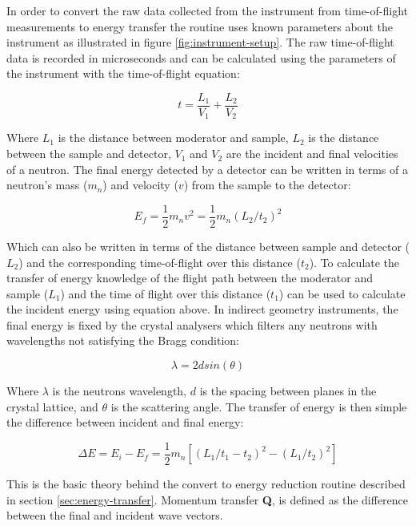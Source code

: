 \documentclass[paper=a4, fontsize=11pt]{scrartcl}	%
\numberwithin{equation}{section}															%
\numberwithin{figure}{section}																%
\numberwithin{table}{section}																%
\begin{document}
In order to convert the raw data collected from the instrument from time-of-flight measurements to energy transfer the routine uses known parameters about the instrument as illustrated in figure \ref{fig:instrument-setup}. The raw time-of-flight data is recorded in microseconds and can be calculated using the parameters of the instrument with the time-of-flight equation:

\begin{equation}
t = \frac{L_1}{V_1} + \frac{L_2}{V_2}
\end{equation}

Where $L_1$ is the distance between moderator and sample, $L_2$ is the distance between the sample and detector, $V_1$ and $V_2$ are the incident and final velocities of a neutron. The final energy detected by a detector can be written in terms of a neutron's mass ($m_{n}$) and velocity ($v$) from the sample to the detector:

\begin{equation}
E_f = \frac{1}{2}m_{n}v^2 = \frac{1}{2}m_{n} ( L_2 / t_2 ) ^2
\end{equation}

Which can also be written in terms of the distance between sample and detector ($L_2$) and the corresponding time-of-flight over this distance ($t_2$). To calculate the transfer of energy knowledge of the flight path between the moderator and sample ($L_1$) and the time of flight over this distance ($t_1$) can be used to calculate the incident energy using equation above. In indirect geometry instruments, the final energy is fixed by the crystal analysers which filters any neutrons with wavelengths not satisfying the Bragg condition:

\begin{equation}
\lambda = 2dsin(\theta)
\end{equation}

Where $\lambda$ is the neutrons wavelength, $d$ is the spacing between planes in the crystal lattice, and $\theta$ is the scattering angle. The transfer of energy is then simple the difference between incident and final energy:

\begin{equation}
\Delta E = E_i - E_f = \frac{1}{2}m_n[(L_1 / t_1-t_2)^2 - (L_1/t_2)^2]
\end{equation}

This is the basic theory behind the convert to energy reduction routine described in section \ref{sec:energy-transfer}. Momentum transfer \textbf{Q}, is defined as the difference between the final and incident wave vectors.
\end{document}
